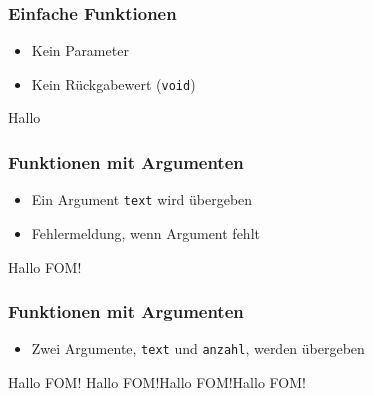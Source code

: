 \documentclass[ngerman]{beamer}
\newcommand{\ta}[1]{\textattachfile[color=1 0 0]{#1}{Code}}
\begin{document}
\begin{frame}[containsverbatim]
\frametitle{Einfache Funktionen}

\begin{itemize}
	\item Kein Parameter
	\item Kein Rückgabewert (\texttt{void})
\end{itemize}

%

\begin{ausgabe}
Hallo
\end{ausgabe}

\end{frame}



\begin{frame}[containsverbatim]
\frametitle{Funktionen mit Argumenten}

\begin{itemize}
	\item Ein Argument \texttt{text} wird übergeben
	\item Fehlermeldung, wenn Argument fehlt
\end{itemize}

%

\begin{ausgabe}
Hallo FOM!
\end{ausgabe}


\end{frame}

\begin{frame}[containsverbatim]
\frametitle{Funktionen mit Argumenten}

\begin{itemize}
	\item Zwei Argumente, \texttt{text} und \texttt{anzahl}, werden übergeben
\end{itemize}

%

\begin{ausgabe}

Hallo FOM!
Hallo FOM!Hallo FOM!Hallo FOM!

\end{ausgabe}

\end{frame}
\end{document}
